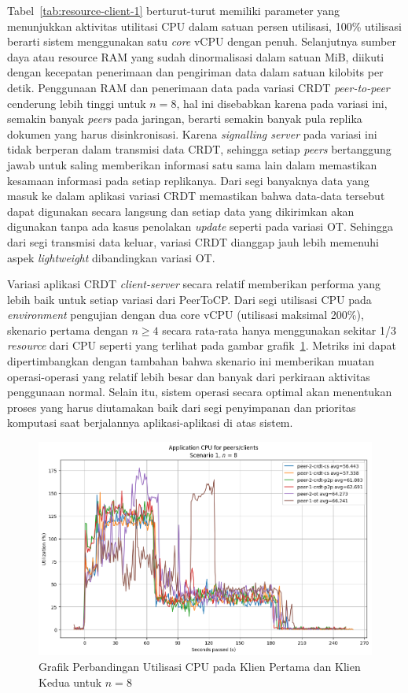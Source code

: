 Tabel~\ref{tab:resource-client-1} berturut-turut memiliki parameter yang menunjukkan aktivitas utilitasi CPU dalam satuan persen utilisasi, 100\% utilisasi berarti sistem menggunakan satu \textit{core} vCPU dengan penuh. Selanjutnya sumber daya atau resource RAM yang sudah dinormalisasi dalam satuan MiB, diikuti dengan kecepatan penerimaan dan pengiriman data dalam satuan kilobits per detik. Penggunaan RAM dan penerimaan data pada variasi CRDT \textit{peer-to-peer} cenderung lebih tinggi untuk $n = 8$, hal ini disebabkan karena pada variasi ini, semakin banyak \textit{peers} pada jaringan, berarti semakin banyak pula replika dokumen yang harus disinkronisasi. Karena \textit{signalling server} pada variasi ini tidak berperan dalam transmisi data CRDT, sehingga setiap \textit{peers} bertanggung jawab untuk saling memberikan informasi satu sama lain dalam memastikan kesamaan informasi pada setiap replikanya. Dari segi banyaknya data yang masuk ke dalam aplikasi variasi CRDT memastikan bahwa data-data tersebut dapat digunakan secara langsung dan setiap data yang dikirimkan akan digunakan tanpa ada kasus penolakan \textit{update} seperti pada variasi OT. Sehingga dari segi transmisi data keluar, variasi CRDT dianggap jauh lebih memenuhi aspek \textit{lightweight} dibandingkan variasi OT.

Variasi aplikasi CRDT \textit{client-server} secara relatif memberikan performa yang lebih baik untuk setiap variasi dari PeerToCP. Dari segi utilisasi CPU pada \textit{environment} pengujian dengan dua core vCPU (utilisasi maksimal 200\%), skenario pertama dengan $n \geq 4$ secara rata-rata hanya menggunakan sekitar 1/3 \textit{resource} dari CPU seperti yang terlihat pada gambar grafik~\ref{fig:2-19}. Metriks ini dapat dipertimbangkan dengan tambahan bahwa skenario ini memberikan muatan operasi-operasi yang relatif lebih besar dan banyak dari perkiraan aktivitas penggunaan normal. Selain itu, sistem operasi secara optimal akan menentukan proses yang harus diutamakan baik dari segi penyimpanan dan prioritas komputasi saat berjalannya aplikasi-aplikasi di atas sistem.

\begin{figure}
 \centering
 \includegraphics[width=13cm]{./assets/skripsi/benchmark-vis_cell_2_output_19}
 \caption{Grafik Perbandingan Utilisasi CPU pada Klien Pertama dan Klien Kedua untuk $n = 8$}
 \label{fig:2-19}
\end{figure}

